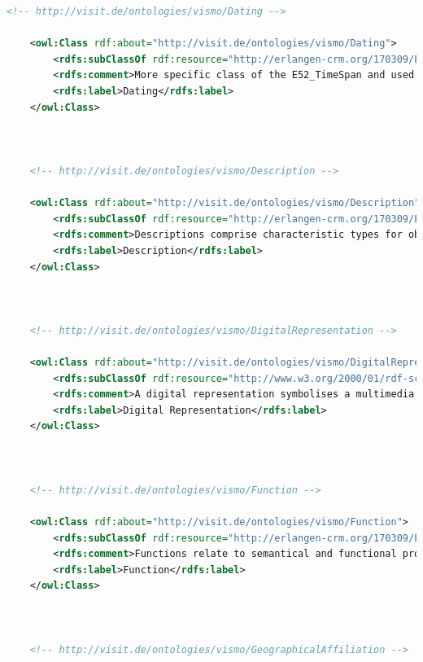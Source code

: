 \begin{lstlisting}[caption={VisMo Ontologie in der letzten (englischen) Version.},label={lst:vismo},captionpos=b,language=xml]
    <!-- http://visit.de/ontologies/vismo/Dating -->

    <owl:Class rdf:about="http://visit.de/ontologies/vismo/Dating">
        <rdfs:subClassOf rdf:resource="http://erlangen-crm.org/170309/E52_Time-Span"/>
        <rdfs:comment>More specific class of the E52_TimeSpan and used in the ViSIT context to give temporal associations with various entities.</rdfs:comment>
        <rdfs:label>Dating</rdfs:label>
    </owl:Class>
    


    <!-- http://visit.de/ontologies/vismo/Description -->

    <owl:Class rdf:about="http://visit.de/ontologies/vismo/Description">
        <rdfs:subClassOf rdf:resource="http://erlangen-crm.org/170309/E55_Type"/>
        <rdfs:comment>Descriptions comprise characteristic types for objects in the domain of museums. Therefore these are for example &quot;painting&quot;, &quot;oil painting&quot;, &quot;chest&quot;, etc.</rdfs:comment>
        <rdfs:label>Description</rdfs:label>
    </owl:Class>
    


    <!-- http://visit.de/ontologies/vismo/DigitalRepresentation -->

    <owl:Class rdf:about="http://visit.de/ontologies/vismo/DigitalRepresentation">
        <rdfs:subClassOf rdf:resource="http://www.w3.org/2000/01/rdf-schema#Class"/>
        <rdfs:comment>A digital representation symbolises a multimedia representation of a vismo:Resource that can be illustrated in some way. These incorporate pictures, videos, audio files, and 3D models in particular.</rdfs:comment>
        <rdfs:label>Digital Representation</rdfs:label>
    </owl:Class>
    


    <!-- http://visit.de/ontologies/vismo/Function -->

    <owl:Class rdf:about="http://visit.de/ontologies/vismo/Function">
        <rdfs:subClassOf rdf:resource="http://erlangen-crm.org/170309/E55_Type"/>
        <rdfs:comment>Functions relate to semantical and functional properties that are inherited by vismo:Object as well as vismo:Architecture and their vismo:Structural Evolution resources. Both an object as well as an architecture could exert &quot;military&quot; functions.</rdfs:comment>
        <rdfs:label>Function</rdfs:label>
    </owl:Class>
    


    <!-- http://visit.de/ontologies/vismo/GeographicalAffiliation -->


\end{lstlisting}
